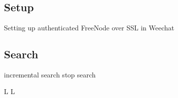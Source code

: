 \subsection{Setup}{Setting up authenticated FreeNode over SSL in Weechat}









\subsection{Search}{}
	{incremental search }
	{stop search}

\copyrightnotice

\supereject
\if L\lr \else\null\vfill\eject\fi
\if L\lr \else\null\vfill\eject\fi
\bye


